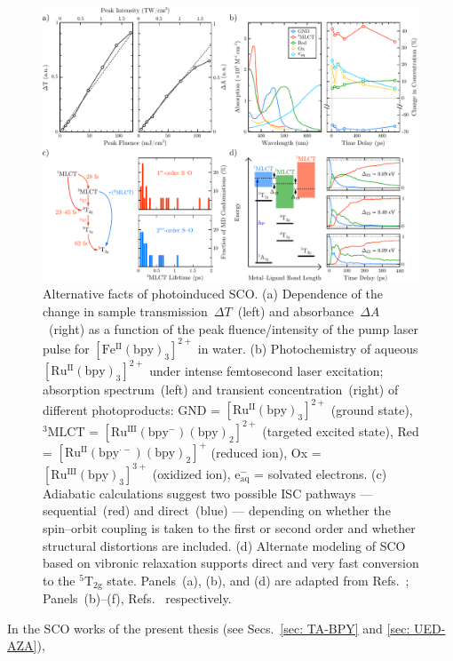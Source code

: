 \begin{figure}[ht!]
  \centering
  \includegraphics[width = \textwidth]{Figures/fig_SCO_literature_alt.pdf}
  \caption[Alternative facts of photoinduced SCO.]{
    Alternative facts of photoinduced SCO.
    (a) Dependence of the change in sample transmission~$\Delta T$~(left)
    and absorbance~$\Delta A$~(right) as a function of the peak fluence/intensity
    of the pump laser pulse for $\mathrm{[Fe^{II}(bpy)_3]^{2+}}$ in water.
    (b) Photochemistry of aqueous $\mathrm{[Ru^{II}(bpy)_3]^{2+}}$
    under intense femtosecond laser excitation;
    absorption spectrum~(left) and transient concentration~(right)
    of different photoproducts:
    GND = $\mathrm{[Ru^{II}(bpy)_3]^{2+}}$ (ground state),
    $\mathrm{^3 MLCT}$ = $\mathrm{[Ru^{III}(bpy^-)(bpy)_2]^{2+}}$ (targeted excited state),
    Red = $\mathrm{[Ru^{II}(bpy^{\cdot -})(bpy)_2]^{+}}$ (reduced ion),
    Ox = $\mathrm{[Ru^{III}(bpy)_3]^{3+}}$ (oxidized ion),
    $\mathrm{e^{-}_{aq}}$ = solvated electrons.
    (c) Adiabatic calculations suggest two possible ISC pathways --- sequential~(red)
    and direct~(blue) --- depending on whether the spin--orbit coupling
    is taken to the first or second order and whether structural distortions
    are included.
    (d) Alternate modeling of SCO based on vibronic relaxation supports
    direct and very fast conversion to the $\mathrm{^5 T_{2g}}$ state.
    Panels~(a), (b), and (d) are adapted from Refs.~\cite{Zhang2014, Tarnovsky2006, Chang2010};
    Panels~(b)--(f), Refs.~\cite{Sousa2013, Sousa2018b} respectively.
  }
  \label{fig: SCO-literature-alt}
\end{figure}
%
In the SCO works of the present thesis (see Secs.~\ref{sec: TA-BPY} and \ref{sec: UED-AZA}),
